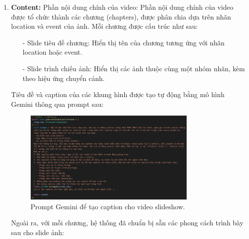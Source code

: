 \begin{enumerate}
    \item \textbf{Content:} Phần nội dung chính của video:
    Phần nội dung chính của video được tổ chức thành các chương (chapters), được phân chia dựa trên nhãn location và event của ảnh. Mỗi chương được cấu trúc như sau:
    \begin{itemize}
        \item[-] Slide tiêu đề chương: Hiển thị tên của chương tương ứng với nhãn location hoặc event. 
        \item[-] Slide trình chiếu ảnh: Hiển thị các ảnh thuộc cùng một nhóm nhãn, kèm theo hiệu ứng chuyển cảnh.
    \end{itemize}
    
    Tiêu đề và caption của các khung hình được tạo tự động bằng mô hình Gemini thông qua prompt sau:
    
    \begin{figure}[H]
        \centering  
        \includegraphics[width=0.8\textwidth]{figures/c4/4_1/prompt.png}
        \caption{Prompt Gemini để tạo caption cho video slideshow.}
        \label{fig:gemini-prompt}
    \end{figure}
    
    Ngoài ra, với mỗi chương, hệ thống đã chuẩn bị sẵn các phong cách trình bày sau cho slide ảnh:
    

\end{enumerate}
